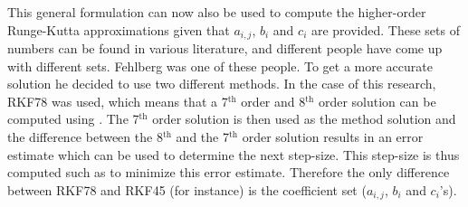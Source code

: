 \noindent
This general formulation can now also be used to compute the higher-order Runge-Kutta approximations given that $a_{i,j}$, $b_{i}$ and $c_{i}$ are provided. These sets of numbers can be found in various literature, and different people have come up with different sets. Fehlberg was one of these people. To get a more accurate solution he decided to use two different methods. In the case of this research, \ac{RKF78} was used, which means that a 7$^\text{th}$ order and 8$^\text{th}$ order solution can be computed using . The 7$^\text{th}$ order solution is then used as the method solution and the difference between the 8$^\text{th}$ and the 7$^{\text{th}}$ order solution results in an error estimate which can be used to determine the next step-size. This step-size is thus computed such as to minimize this error estimate. Therefore the only difference between \ac{RKF78} and \ac{RKF45} (for instance) is the coefficient set ($a_{i,j}$, $b_{i}$ and $c_{i}$'s). 









